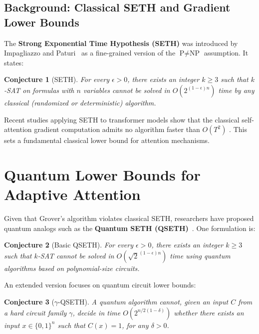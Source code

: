 \documentclass[conference]{IEEEtran}
\newtheorem{conjecture}{Conjecture}
\begin{document}
\subsection{Background: Classical SETH and Gradient Lower Bounds}

The \textbf{Strong Exponential Time Hypothesis (SETH)} was introduced by Impagliazzo and Paturi~\cite{ImpagliazzoPaturi2001} as a fine-grained version of the \( \text{P} \neq \text{NP} \) assumption. It states:

\begin{conjecture}[SETH]
\label{conj:seth}
For every \( \epsilon > 0 \), there exists an integer \( k \geq 3 \) such that \( k \)-SAT on formulas with \( n \) variables cannot be solved in \( O(2^{(1 - \epsilon)n}) \) time by any classical (randomized or deterministic) algorithm.
\end{conjecture}

Recent studies applying SETH to transformer models show that the classical self-attention gradient computation admits no algorithm faster than $O(T^2)$ \cite{ alman2024fine}. This sets a fundamental classical lower bound for attention mechanisms.

\section{Quantum Lower Bounds for Adaptive Attention}

Given that Grover's algorithm violates classical SETH, researchers have proposed quantum analogs such as the \textbf{Quantum SETH (QSETH)}~\cite{buhrman2019quantum}. One formulation is:

\begin{conjecture}[Basic QSETH]
\label{conj:qseth}
For every \( \epsilon > 0 \), there exists an integer \( k \geq 3 \) such that \( k \)-SAT cannot be solved in \( O(\sqrt{2}^{(1 - \epsilon)n}) \) time using quantum algorithms based on polynomial-size circuits.
\end{conjecture}

An extended version focuses on quantum circuit lower bounds:

\begin{conjecture}[\( \gamma \)-QSETH]
\label{conj:gamma_qseth}
A quantum algorithm cannot, given an input \( C \) from a hard circuit family \( \gamma \), decide in time \( O(2^{n/2(1 - \delta)}) \) whether there exists an input \( x \in \{0, 1\}^n \) such that \( C(x) = 1 \), for any \( \delta > 0 \).
\end{conjecture}
\end{document}

